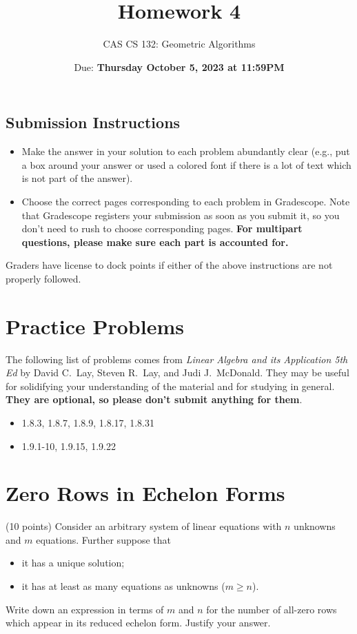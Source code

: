 \documentclass{article}
\title{
  Homework 4
}
\author{CAS CS 132: Geometric Algorithms}
\date{Due: \textbf{Thursday October 5, 2023 at 11:59PM}}
\theoremstyle{remark}
\begin{document}
\maketitle

\subsection*{Submission Instructions}
\begin{itemize}
\item Make the answer in your solution to each problem abundantly clear (e.g., put a box around your answer or used a colored font if there is a lot of text which is not part of the answer).
\item Choose the correct pages corresponding to each problem in Gradescope. Note that Gradescope registers your submission as soon as you submit it, so you don't need to rush to choose corresponding pages.
  \textbf{For multipart questions, please make sure each part is accounted for.}
\end{itemize}
Graders have license to dock points if either of the above instructions are not properly followed.


\section*{Practice Problems}

The following list of problems comes from \textit{Linear Algebra and its Application 5th Ed} by David C.\ Lay, Steven R.\ Lay, and Judi J.\ McDonald.
They may be useful for solidifying your understanding of the material and for studying in general.
\textbf{They are optional, so please don't submit anything for them}.

\begin{itemize}
\item 1.8.3, 1.8.7, 1.8.9, 1.8.17, 1.8.31
\item 1.9.1-10, 1.9.15, 1.9.22
\end{itemize}

\pagebreak
\section{Zero Rows in Echelon Forms}
(10 points) Consider an arbitrary system of linear equations with $n$ unknowns and $m$ equations.
Further suppose that
\begin{itemize}
\item it has a unique solution;
\item it has at least as many equations as unknowns ($m \geq n$).
\end{itemize}
Write down an expression in terms of $m$ and $n$ for the number of all-zero rows which appear in its reduced echelon form.
Justify your answer.
\end{document}
